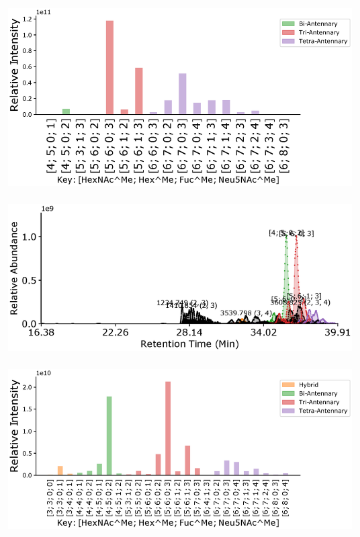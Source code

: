 \begin{figure}[htb]
\begin{minipage}{1\linewidth}
\begin{subfigure}[b]{0.49\linewidth}
                \subcaption{
                    \label{fig:agp_assignment:c}
                }
            \end{subfigure}
            \vspace{0pt}
            \begin{subfigure}[b]{0.49\linewidth}
                \includegraphics[width=1\linewidth, valign=b]{figure/dp_agp_abundances.eps}
                \subcaption{
                    \label{fig:agp_assignment:d}
                }
            \end{subfigure}
        \end{minipage}
        \begin{minipage}{1\linewidth}
            \centering
            \begin{subfigure}[b]{0.49\linewidth}
                \includegraphics[width=1\linewidth, valign=t]{figure/rp_agp_chromatograms.eps}
                \subcaption{
                    \label{fig:agp_assignment:e}
                }
            \end{subfigure}
            \vspace{0pt}
            \begin{subfigure}[b]{0.49\linewidth}
                \includegraphics[width=1\linewidth, valign=b]{figure/rp_agp_abundances.eps}

\end{subfigure}
\end{minipage}
\end{figure}
